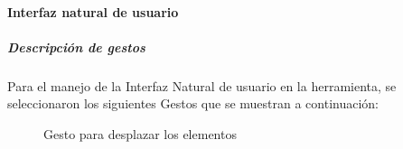 \paragraph{Interfaz natural de usuario}
\subparagraph{Descripción de gestos} \hspace{1cm}
\vspace{0.5cm}

Para el manejo de la Interfaz Natural de usuario en la herramienta, se seleccionaron los siguientes Gestos que se muestran a continuación:\\

\begin{figure}[H]
	\centering
	\caption{Gesto para desplazar los elementos}
	\label{fig:Gesto_Cursor}
\end{figure}


